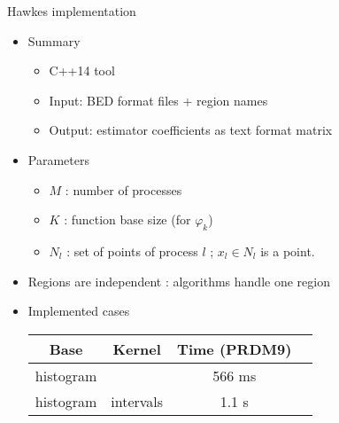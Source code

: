 \documentclass{beamer}
\begin{document}
\begin{frame}{Hawkes implementation}
    \begin{itemize}
        \item Summary
            \begin{itemize}
            \item C++14 tool
            \item Input: BED format files + region names
            \item Output: estimator coefficients as text format matrix
        \end{itemize}
        \item Parameters
        \begin{itemize}
            \item $M$ : number of processes
            \item $K$ : function base size (for $\varphi_k$)
            \item $N_l$ : set of points of process $l$ ; $x_l \in N_l$ is a point.
        \end{itemize}
        \item Regions are independent : algorithms handle one region
        \item Implemented cases

        \begin{tabular}{|c|c|c|c|} \hline
            \textbf{Base} & \textbf{Kernel} & \textbf{Time (PRDM9)} \\ \hline
            histogram & & 566 ms \\ \hline
            histogram & intervals & 1.1 s \\ \hline
        \end{tabular}
    \end{itemize}
\end{frame}
\end{document}
